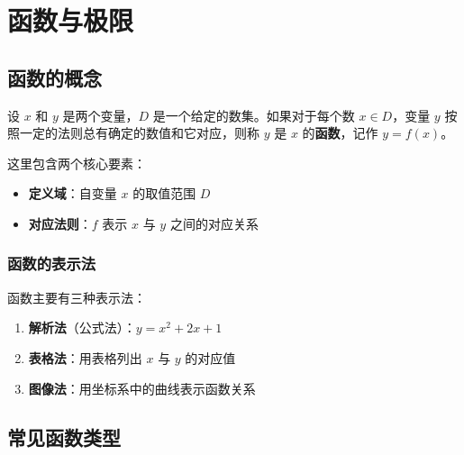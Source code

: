\documentclass{harryopo-mathnotes}
\date{2026 年 6 月 21 日}
\begin{document}
\maketitle
\thispagestyle{empty}
\cleardoublepage

\setcounter{tocdepth}{2}
\tableofcontents
\cleardoublepage

\strictpagecheck
\setcounter{page}{1}
\restoregeometry
\onehalfspacing

\section{函数与极限}

\subsection{函数的概念}

设 $x$ 和 $y$ 是两个变量，$D$ 是一个给定的数集。如果对于每个数 $x \in D$，变量 $y$ 按照一定的法则总有确定的数值和它对应，则称 $y$ 是 $x$ 的\textbf{函数}，记作 $y = f(x)$。

这里包含两个核心要素：

\begin{itemize}
  \item \textbf{定义域}：自变量 $x$ 的取值范围 $D$
  \item \textbf{对应法则}：$f$ 表示 $x$ 与 $y$ 之间的对应关系
\end{itemize}

\subsubsection{函数的表示法}

函数主要有三种表示法：

\begin{enumerate}
  \item \textbf{解析法}（公式法）：$y = x^2 + 2x + 1$
  \item \textbf{表格法}：用表格列出 $x$ 与 $y$ 的对应值
  \item \textbf{图像法}：用坐标系中的曲线表示函数关系
\end{enumerate}

\subsection{常见函数类型}
\end{document}
